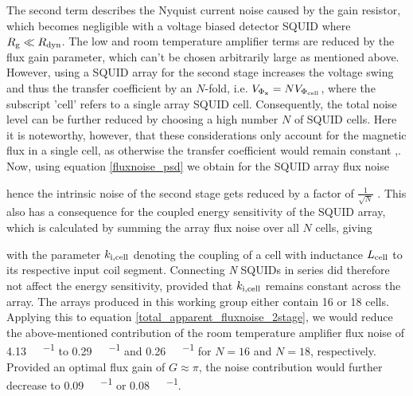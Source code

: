 The second term describes the Nyquist current noise caused by the gain resistor, which becomes negligible with a voltage biased detector SQUID where $R_{\rm g}\ll R_{\rm dyn}$. The low and room temperature amplifier terms are reduced by the flux gain parameter, which can't be chosen arbitrarily large as mentioned above. However, using a SQUID array for the second stage increases the voltage swing and thus the transfer coefficient by an $N$-fold, i.e. $V_{\rm \Phi_x} = NV_{\rm \Phi_{cell}}$, where the subscript 'cell' refers to a single array SQUID cell. Consequently, the total noise level can be further reduced by choosing a high number $N$ of SQUID cells. Here it is noteworthy, however, that these considerations only account for the magnetic flux in a single cell, as otherwise the transfer coefficient would remain constant \cite{Stawiasz1993},\cite{Foglietti1993}.  Now, using equation \ref{fluxnoise_psd} we obtain for the SQUID array flux noise


hence the intrinsic noise of the second stage gets reduced by a factor of $\frac{1}{\sqrt{N}}$ \cite{Stawiasz1993}. This also has a consequence for the coupled energy sensitivity of the SQUID array, which is calculated by summing the array flux noise over all $N$ cells, giving




with the parameter $k_{\rm i,cell}$ denoting the coupling of a cell with inductance $L_{\rm cell}$ to its respective input coil segment. Connecting \textit{N} SQUIDs in series did therefore not affect the energy sensitivity, provided that $k_{\rm i,cell}$ remains constant across the array. The arrays produced in this working group either contain 16 \cite{Kempf2015} or 18 \cite{Krä2023} cells. Applying this to equation \ref{total_apparent_fluxnoise_2stage}, we would reduce the above-mentioned contribution of the room temperature amplifier flux noise of \qty{4.13}{\micro\fq\per\sqrthz} to \qty{0.29}{\micro\fq\per\sqrthz} and \qty{0.26}{\micro\fq\per\sqrthz} for $N=16$ and $N=18$, respectively. Provided an optimal flux gain of $G\approx\pi$, the noise contribution would further decrease to \qty{0.09}{\micro\fq\per\sqrthz} or \qty{0.08}{\micro\fq\per\sqrthz}. \\


